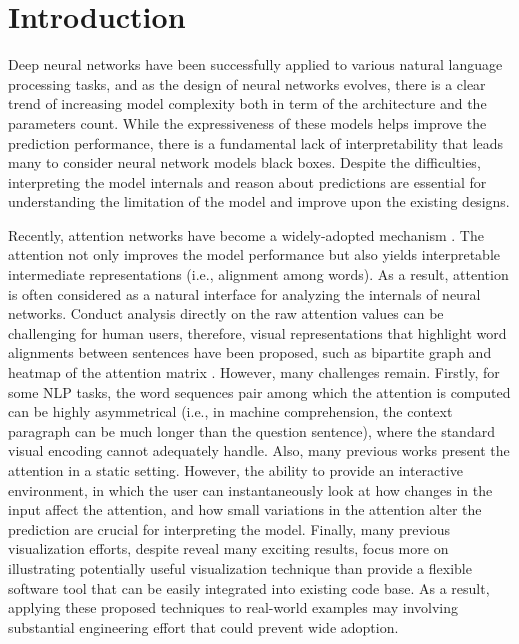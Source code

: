 \section{Introduction}

Deep neural networks have been successfully applied to various natural language processing tasks,
and as the design of neural networks evolves, there is a clear trend of increasing model complexity both in term of the architecture and the parameters count. 
%
While the expressiveness of these models helps improve the prediction performance, there is a fundamental lack of interpretability that leads many to consider neural network models black boxes. 
%
Despite the difficulties, interpreting the model internals and reason about predictions are essential for understanding the limitation of the model and improve upon the existing designs.


Recently, attention networks have become a widely-adopted mechanism \cite{VaswaniShazeerParmar2017, Parikh2016}. The attention not only improves the model performance but also yields interpretable intermediate representations (i.e., alignment among words). As a result, attention is often considered as a natural interface for analyzing the internals of neural networks. Conduct analysis directly on the raw attention values can be challenging for human users, therefore, visual representations that highlight word alignments between sentences have been proposed, such as bipartite graph and heatmap of the attention matrix \cite{LiChenHovy2015, li2016understanding, lee2017interactive}.  However, many challenges remain. Firstly, for some NLP tasks, the word sequences pair among which the attention is computed can be highly asymmetrical (i.e., in machine comprehension, the context paragraph can be much longer than the question sentence), where the standard visual encoding cannot adequately handle.  Also, many previous works present the attention in a static setting. However, the ability to provide an interactive environment, in which the user can instantaneously look at how changes in the input affect the attention, and how small variations in the attention alter the prediction are crucial for interpreting the model. Finally, many previous visualization efforts, despite reveal many exciting results, focus more on illustrating potentially useful visualization technique than provide a flexible software tool that can be easily integrated into existing code base. As a result, applying these proposed techniques to real-world examples may involving substantial engineering effort that could prevent wide adoption.

